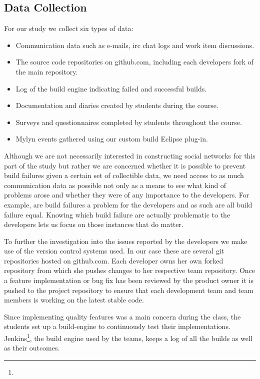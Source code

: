 \subsection{Data Collection}
For our study we collect six types of data:
\begin{itemize}
\item Communication data such as e-mails, irc chat logs and work item discussions.
\item The source code repositories on github.com, including each developers fork of the main repository.
\item Log of the build engine indicating failed and successful builds.
\item Documentation and diaries created by students during the course.
\item Surveys and questionnaires completed by students throughout the course. 
\item Mylyn events gathered using our custom build Eclipse plug-in.
\end{itemize}

Although we are not necessarily interested in constructing social networks for this part of the study but rather we are concerned whether it is possible to prevent build failures given a certain set of collectible data, we need access to as much communication data as possible not only as a means to see what kind of problems arose and whether they were of any importance to the developers.
For example, are build failures a problem for the developers and as such are all build failure equal.
Knowing which build failure are actually problematic to the developers lets us focus on those instances that do matter.

To further the investigation into the issues reported by the developers we make use of the version control systems used.
In our case these are several git repositories hosted on github.com.
Each developer owns her own forked repository from which she pushes changes to her respective team repository.
Once a feature implementation or bug fix has been reviewed by the product owner it is pushed to the project repository to ensure that each development team and team members is working on the latest stable code.

Since implementing quality features was a main concern during the class, the students set up a build-engine to continuously test their implementations.
Jenkins\footnote{}, the build engine used by the teams, keeps a log of all the builds as well as their outcomes.

